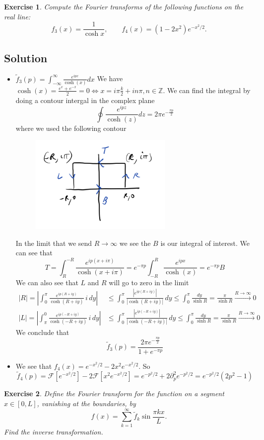 \documentclass[11pt,a4paper]{article}
\newtheorem*{exercise}{Exercise}
\newcommand{\solution}[1]{
	\subsection*{Solution}
	#1
}
\begin{document}
{\begin{exercise}
	Compute the Fourier transforms of the following functions on the real line:
	\[
	f_3(x) = \frac{1}{\cosh x}, \qquad f_4(x) = (1 - 2x^2)e^{-x^2/2}.
	\]
\end{exercise}
\solution{
\begin{itemize}
\item $\tilde{f}_{3}(p) = \int_{-\infty}^{\infty}\frac{e^{ipx}}{\cosh{(x)}}dx$ We have $\cosh{(x)} = \frac{e^{x}+e^{-x}}{2} = 0 \Leftrightarrow x = i\pi\frac{k}{2}+in\pi, n\in\mathbb{Z}$.
We can find the integral by doing a contour intergal in the complex plane
$$
\oint \frac{e^{ipz}}{\cosh{(z)}}dz = 2\pi e^{-\frac{\pi p}{2}}
$$
where we used the following contour
\begin{figure}[H]
	\centering
	\includegraphics[width=0.65\textwidth]{contour1.png} %
\end{figure}
In the limit that we send $R\to\infty$ we see the $B$ is our integral of interest. We can see that
$$
T = \int_{R}^{-R}\frac{e^{ip(x+i\pi)}}{\cosh{(x+i\pi)}} = e^{-\pi p}\int_{-R}^{R}\frac{e^{ipx}}{\cosh{(x)}} = e^{-\pi p}B
$$
We can also see that $L$ and $R$ will go to zero in the limit
$$
\begin{aligned}
|R| = 	\left|\int_{0}^{\pi} \frac{e^{ip(R+iy)}}{\cosh(R+iy)}\, i\,dy\right|
	&\le \int_{0}^{\pi} \frac{|e^{ip(R+iy)}|}{|\cosh(R+iy)|}\,dy
	\le \int_{0}^{\pi} \frac{dy}{\sinh R}
	= \frac{\pi}{\sinh R}\xrightarrow{R\to\infty}0\\[4pt]
|L| = 	\left|\int_{\pi}^{0} \frac{e^{ip(-R+iy)}}{\cosh(-R+iy)}\, i\,dy\right|
	&\le \int_{0}^{\pi} \frac{|e^{ip(-R+iy)}|}{|\cosh(-R+iy)|}\,dy
	\le \int_{0}^{\pi} \frac{dy}{\sinh R}
	= \frac{\pi}{\sinh R}\xrightarrow{R\to\infty}0
\end{aligned}
$$
We conclude that 
$$
\tilde{f}_{3}(p) = \frac{2\pi e^{-\frac{\pi p}{2}}}{1+e^{-\pi p}}
$$
\item We see that $f_{4}(x) = e^{-x^{2}/2}-2x^{2}e^{-x^{2}/2}$. So
$$
\tilde{f}_{4}(p) = \mathcal{F}[e^{-x^{2}/2}]-2\mathcal{F}[x^{2}e^{-x^{2}/2}] = e^{-p^2/2}+2\partial_{p}^2e^{-p^2/2} =e^{-p^2/2}(2p^2-1)$$
\end{itemize}
} 
\begin{exercise}
	Define the Fourier transform for the function on a segment $x \in [0, L]$, vanishing at the boundaries, by
	\[
	f(x) = \sum_{k=1}^{\infty} \tilde{f}_k \sin\frac{\pi kx}{L}.
	\]
	Find the inverse transformation.
\end{exercise}



}
\end{document}
